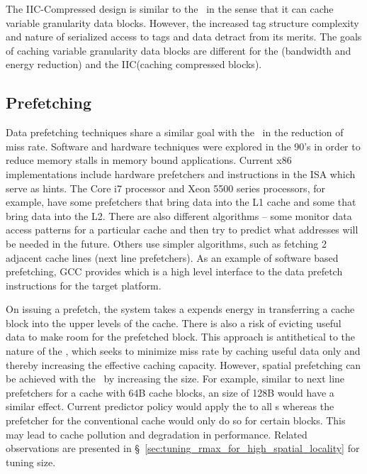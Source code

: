 The IIC-Compressed design is similar to the \AC\ in the sense that it can cache variable granularity data blocks. However, the increased tag structure complexity and nature of serialized access to tags and data detract from its merits. The goals of caching variable granularity data blocks are different for the \AC{}(bandwidth and energy reduction) and the IIC(caching compressed blocks). 

\subsection{Prefetching}

Data prefetching techniques share a similar goal with the \AC\ in the reduction of miss rate. Software and hardware techniques were explored in the 90's\cite{prefetchers} in order to reduce memory stalls in memory bound applications. Current x86 implementations include hardware prefetchers and instructions in the ISA which serve as hints. The Core i7 processor and Xeon 5500 series processors, for example, have some prefetchers that bring data into the L1 cache and some that bring data into the L2. There are also different algorithms – some monitor data access patterns for a particular cache and then try to predict what addresses will be needed in the future. Others use simpler algorithms, such as fetching 2 adjacent cache lines (next line prefetchers). As an example of software based prefetching, GCC provides  which is a high level interface to the data prefetch instructions for the target platform.

On issuing a prefetch, the system takes a expends energy in transferring a cache block into the upper levels of the cache. There is also a risk of evicting useful data to make room for the prefetched block. This approach is antithetical to the nature of the \AC{}, which seeks to minimize miss rate by caching useful data only and thereby increasing the effective caching capacity. However, spatial prefetching can be achieved with the \AC\ by increasing the  size. For example, similar to next line prefetchers for a cache with 64B cache blocks, an  size of 128B would have a similar effect. Current predictor policy would apply the  to all \AB{}s whereas the prefetcher for the conventional cache would only do so for certain blocks. This may lead to cache pollution and degradation in performance. Related observations are presented in \S~\ref{sec:tuning_rmax_for_high_spatial_locality} for tuning  size. 

